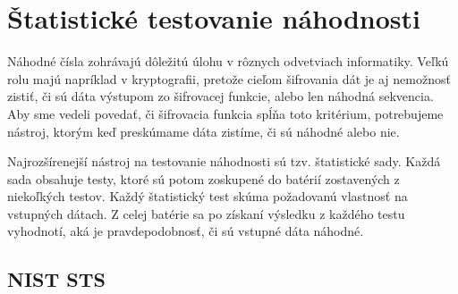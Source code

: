 \chapter{Štatistické testovanie náhodnosti}
\label{chap:statistic-tests}

Náhodné čísla zohrávajú dôležitú úlohu v rôznych odvetviach informatiky. Veľkú rolu majú napríklad v kryptografii, pretože cieľom šifrovania dát je aj nemožnosť zistiť, či sú dáta výstupom zo šifrovacej funkcie, alebo len náhodná sekvencia. Aby sme vedeli povedať, či šifrovacia funkcia spĺňa toto kritérium, potrebujeme nástroj, ktorým keď preskúmame dáta zistíme, či sú náhodné alebo nie.

Najrozšírenejší nástroj na testovanie náhodnosti sú tzv. štatistické sady. Každá sada obsahuje testy, ktoré sú potom zoskupené do batérií zostavených z niekoľkých testov. Každý štatistický test skúma požadovanú vlastnosť na vstupných dátach. Z celej batérie sa po získaní výsledku z každého testu vyhodnotí, aká je pravdepodobnosť, či sú vstupné dáta náhodné.

\section{NIST STS}
\label{sec:sts-nist}

